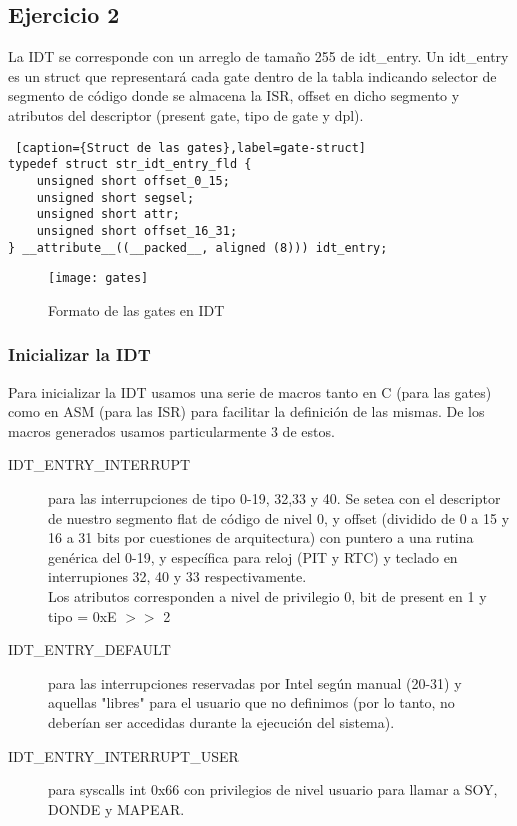 \subsection{Ejercicio 2}

La IDT se corresponde con un arreglo de tamaño 255 de idt_entry. Un idt_entry es un struct que representará cada gate dentro de la tabla indicando selector de segmento de código donde se almacena la ISR, offset en dicho segmento y atributos del descriptor (present gate, tipo de gate y dpl). 

\begin{lstlisting} [caption={Struct de las gates},label=gate-struct]
typedef struct str_idt_entry_fld {
    unsigned short offset_0_15;
    unsigned short segsel;
    unsigned short attr;
    unsigned short offset_16_31;
} __attribute__((__packed__, aligned (8))) idt_entry;
\end{lstlisting}

\begin{figure}[H]
    \centering
    \texttt{[image: gates]}
    \caption{Formato de las gates en IDT}
    \label{fig:gates}
\end{figure}



\subsubsection{Inicializar la IDT}

Para inicializar la IDT usamos una serie de macros tanto en C (para las gates) como en ASM (para las ISR) para facilitar la definición de las mismas.
De los macros generados usamos particularmente 3 de estos.
\begin{description}
\item [IDT_ENTRY_INTERRUPT] para las interrupciones de tipo 0-19, 32,33 y 40. Se setea con el descriptor de nuestro segmento flat de código de nivel 0, y offset (dividido de 0 a 15 y 16 a 31 bits por cuestiones de arquitectura) con puntero a una rutina genérica del 0-19, y específica para reloj (PIT y RTC) y teclado en interrupiones 32, 40 y 33 respectivamente. \\
Los atributos corresponden a nivel de privilegio 0, bit de present en 1 y tipo = 0xE $>>$ 2
\item [IDT_ENTRY_DEFAULT] para las interrupciones reservadas por Intel según manual (20-31) y aquellas "libres" para el usuario que no definimos (por lo tanto, no deberían ser accedidas durante la ejecución del sistema). 
\item [IDT_ENTRY_INTERRUPT_USER] para syscalls int 0x66 con privilegios de nivel usuario para llamar a SOY, DONDE y MAPEAR.
\end{description} 

